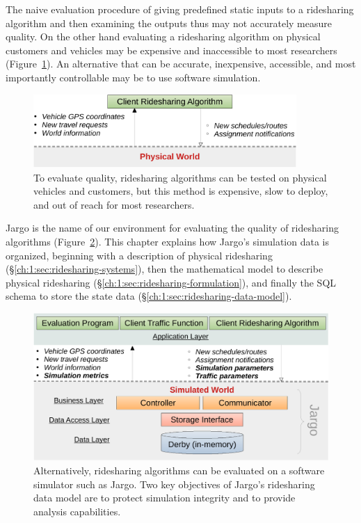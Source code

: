 The naive evaluation procedure of giving predefined static inputs to a
ridesharing algorithm and then examining the outputs thus may not accurately
measure quality. On the other hand evaluating a ridesharing algorithm on
physical customers and vehicles may be expensive and inaccessible to most
researchers (Figure~\ref{fig:physical}).  An alternative that can be accurate,
inexpensive, accessible, and most importantly controllable may be to use
software simulation.

\begin{figure}[h]
\centering
\includegraphics[width=100mm]{fig/physical}
\caption{To evaluate quality, ridesharing algorithms can be tested on physical
vehicles and customers, but this method is expensive, slow to deploy, and out
of reach for most researchers.}
\label{fig:physical}
\end{figure}

Jargo is the name of our environment for evaluating the quality of ridesharing
algorithms (Figure~\ref{fig:architecture}).
This chapter explains how Jargo's simulation data is organized, beginning with
a description of physical ridesharing (\S\ref{ch:1:sec:ridesharing-systems}),
then the mathematical model to describe physical ridesharing
(\S\ref{ch:1:sec:ridesharing-formulation}), and finally the SQL schema to store
the state data (\S\ref{ch:1:sec:ridesharing-data-model}).

\begin{figure}[h]
\centering
\includegraphics[width=120mm]{fig/architecture}
\caption{Alternatively, ridesharing algorithms can be evaluated on a software
simulator such as Jargo. Two key objectives of Jargo's ridesharing data model
are to protect simulation integrity and to provide analysis capabilities.}
\label{fig:architecture}
\end{figure}

